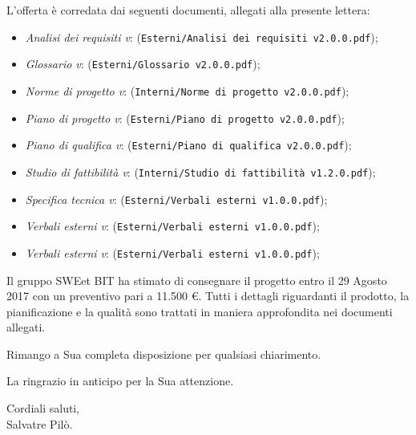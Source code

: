 	L'offerta è corredata dai seguenti documenti, allegati alla presente lettera:
	\begin{itemize}
		\item \emph{Analisi dei requisiti v\VersioneAR{}}: (\verb|Esterni/Analisi dei requisiti v2.0.0.pdf|);
		\item \emph{Glossario v\VersioneG{}}: (\verb|Esterni/Glossario v2.0.0.pdf|);
		\item \emph{Norme di progetto v\VersioneNP{}}: (\verb|Interni/Norme di progetto v2.0.0.pdf|);
		\item \emph{Piano di progetto v\VersionePP{}}: (\verb|Esterni/Piano di progetto v2.0.0.pdf|);
		\item \emph{Piano di qualifica v\VersionePQ{}}: (\verb|Esterni/Piano di qualifica v2.0.0.pdf|);
		\item \emph{Studio di fattibilità v\VersioneSF{}}: (\verb|Interni/Studio di fattibilità v1.2.0.pdf|);
		\item \emph{Specifica tecnica v\VersioneST{}}: (\verb|Esterni/Verbali esterni v1.0.0.pdf|);
		\item \emph{Verbali esterni v\VersioneVE{}}: (\verb|Esterni/Verbali esterni v1.0.0.pdf|);
		\item \emph{Verbali esterni v\VersioneVE{}}: (\verb|Esterni/Verbali esterni v1.0.0.pdf|);
	\end{itemize}
	Il gruppo SWEet BIT ha stimato di consegnare il progetto entro il 29 Agosto 2017
	con un preventivo pari a 11.500 \euro .
	Tutti i dettagli riguardanti il prodotto, la pianificazione e la qualità sono trattati in maniera approfondita
	nei documenti allegati.
	\begin{flushleft}
	\vspace{2cm}
		Rimango a Sua completa disposizione per qualsiasi chiarimento.
	\end{flushleft}
	\begin{flushleft}
		La ringrazio in anticipo per la Sua attenzione.
	\end{flushleft}
	\vspace{5mm}
	\begin{center}
		Cordiali saluti,\\
		\vspace{1cm}Salvatre Pilò.
	\end{center}
